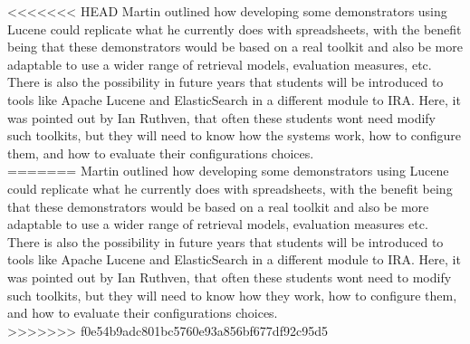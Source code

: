 <<<<<<< HEAD
Martin outlined how developing some demonstrators using Lucene could replicate what he currently does with spreadsheets, with the benefit being that these demonstrators would be based on a real toolkit and also be more adaptable to use a wider range of retrieval models, evaluation measures, etc. There is also the possibility in future years that students will be introduced to tools like Apache Lucene and ElasticSearch in a different module to IRA. Here, it was pointed out by Ian Ruthven, that often these students wont need modify such toolkits, but they will need to know how the systems work, how to configure them, and how to evaluate their configurations choices.\\
=======
Martin outlined how developing some demonstrators using Lucene could replicate what he currently does with spreadsheets, with the benefit being that these demonstrators would be based on a real toolkit and also be more adaptable to use a wider range of retrieval models, evaluation measures etc. There is also the possibility in future years that students will be introduced to tools like Apache Lucene and ElasticSearch in a different module to IRA. Here, it was pointed out by Ian Ruthven, that often these students wont need to modify such toolkits, but they will need to know how they work, how to configure them, and how to evaluate their configurations choices.\\
>>>>>>> f0e54b9adc801bc5760e93a856bf677df92c95d5

